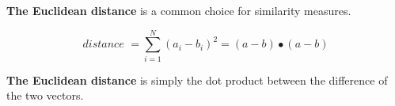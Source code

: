 \documentclass[12pt]{article}
\begin{document}
\begin{landscape}

\centerline{\textbf{The Euclidean distance} is a common choice for similarity measures.}
$$ \textit{distance } = \sum_{i=1}^{N} (a_i - b_i)^2 = (a - b) \bullet (a - b)$$
\centerline{\textbf{The Euclidean distance} is simply the dot product between the difference of the two vectors.}

\end{landscape}
\end{document}
